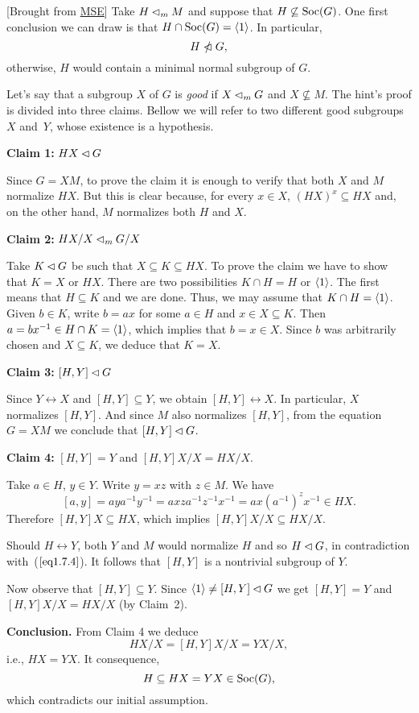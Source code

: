 \begin{solution} {[Brought from \href{https://math.stackexchange.com/a/1220274/269050}{MSE}]} Take $H\lhd_mM$ and suppose that $H\not\subseteq{\rm Soc}(G)$. One first conclusion we can draw is that $H\cap{\rm Soc}(G)=\langle1\rangle$. In particular, 
\begin{equation}\label{eq1.7.4}
    H\nnormal G,
\end{equation}
otherwise, $H$ would contain a minimal normal subgroup of $G$.

Let's say that a subgroup $X$ of $G$ is \textsl{good} if $X\lhd_mG$ and $X\not\subseteq M$. The hint's proof is divided into three claims. Bellow we will refer to two different good subgroups~$X$ and~$Y$, whose existence is a hypothesis.

\textbf{Claim 1:} $HX\lhd G$

{\small Since $G=XM$, to prove the claim it is enough to verify that both $X$ and $M$ normalize $HX$. But this is clear because, for every $x\in X$, $(HX)^x\subseteq HX$ and, on the other hand, $M$ normalizes both $H$ and $X$.}

\medskip

\textbf{Claim 2:} $HX/X\lhd_mG/X$

{\small Take $K\lhd G$ be such that $X\subseteq K\subseteq HX$. To prove the claim we have to show that $K=X$ or $HX$. There are two possibilities $K\cap H=H$ or $\langle1\rangle$. The first means that $H\subseteq K$ and we are done. Thus, we may assume that $K\cap H=\langle1\rangle$. Given $b\in K$, write $b=ax$ for some $a\in H$ and $x\in X\subseteq K$. Then $a=bx^{-1}\in H\cap K=\langle1\rangle$, which implies that $b=x\in X$. Since $b$ was arbitrarily chosen and $X\subseteq K$, we deduce that $K=X$.}

\medskip

\textbf{Claim 3:} $[H,Y]\lhd G$

{\small Since $Y\leftrightarrow X$ and $[H,Y]\subseteq Y$, we obtain $[H,Y]\leftrightarrow X$. In particular, $X$ normalizes $[H,Y]$. And since $M$ also normalizes $[H,Y]$, from the equation $G=XM$ we conclude that $[H,Y] \lhd G$.
}

\medskip

\textbf{Claim 4:} $[H,Y]=Y$ and $[H,Y]X/X= HX/X$.

{\small Take $a\in H$, $y\in Y$. Write $y=xz$ with $z\in M$. We have
$$
    [a,y]=aya^{-1}y^{-1}=axza^{-1}z^{-1}x^{-1}
        = ax(a^{-1})^zx^{-1}\in HX.
$$
Therefore $[H,Y]X\subseteq HX$, which implies $[H,Y]X/X\subseteq HX/X$. 

Should $H\leftrightarrow Y$, both $Y$ and $M$ would normalize $H$ and so $H\lhd G$, in contradiction with~($\ref{eq1.7.4}$). It follows that $[H,Y]$ is a nontrivial subgroup of $Y$.

Now observe that $[H,Y]\subseteq Y$. Since $\langle1\rangle\ne[H,Y]\lhd G$ we get $[H,Y]=Y$ and $[H,Y]X/X=HX/X$ (by Claim~2).}

\medskip

\textbf{Conclusion.} From Claim 4 we deduce
$$
    HX/X=[H,Y]X/X = YX/X,
$$
i.e., $HX=YX$. It consequence,
$$
    H \subseteq HX = YX\in{\rm Soc}(G),
$$
which contradicts our initial assumption.  \end{solution}


